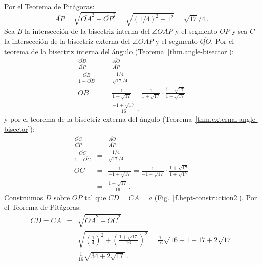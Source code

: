 Por el Teorema de Pitágoras:
\[
\overline{AP}=\sqrt{\overline{OA}^2+\overline{OP}^2}=\sqrt{(1/4)^2+1^2}=\sqrt{17}/4\,.
\]
Sea $B$ la intersección de la bisectriz interna del $\angle OAP$ y el segmento $\overline{OP}$ y sea $C$ la intersección de la bisectriz externa del $\angle OAP$ y el segmento $\overline{QO}$. Por el teorema de la bisectriz interna del ángulo (Teorema~\ref{thm.angle-bisector}):
\begin{eqnarray*}
\frac{\overline{OB}}{\overline{BP}}&=&\frac{\overline{AO}}{\overline{AP}}\\
\frac{\overline{OB}}{1-\overline{OB}}&=&\frac{1/4}{\sqrt{17}/{4}}\\
\overline{OB}&=&\frac{1}{1+\sqrt{17}}=\frac{1}{1+\sqrt{17}}\cdot \frac{1-\sqrt{17}}{1-\sqrt{17}}\\
&=&\frac{-1+\sqrt{17}}{16}\,,
\end{eqnarray*}
y por el teorema de la bisectriz externa del ángulo (Teorema~\ref{thm.external-angle-bisector}):
\begin{eqnarray*}
\frac{\overline{OC}}{\overline{CP}}&=&\frac{\overline{AO}}{\overline{AP}}\\
\frac{\overline{OC}}{1+\overline{OC}}&=&\frac{1/4}{\sqrt{17}/{4}}\\
\overline{OC}&=&\frac{1}{-1+\sqrt{17}}=\frac{1}{-1+\sqrt{17}}\cdot \frac{1+\sqrt{17}}{1+\sqrt{17}}\\
&=&\frac{1+\sqrt{17}}{16}\,.
\end{eqnarray*}%
Construimos $D$ sobre $\overline{OP}$ tal que $\overline{CD}=\overline{CA}=a$ (Fig.~\ref{f.hept-construction2}). Por el Teorema de Pitágoras:
\begin{eqnarray*}
\overline{CD}=\overline{CA}&=&\sqrt{\overline{OA}^2+\overline{OC}^2}\\
&=&\sqrt{\left(\frac{1}{4}\right)^2+\left(\frac{1+\sqrt{17}}{16}\right)^2}=\frac{1}{16}\sqrt{16+1+17+2\sqrt{17}}\\
&=&\frac{1}{16}\sqrt{34+2\sqrt{17}}\,.
\end{eqnarray*}%
